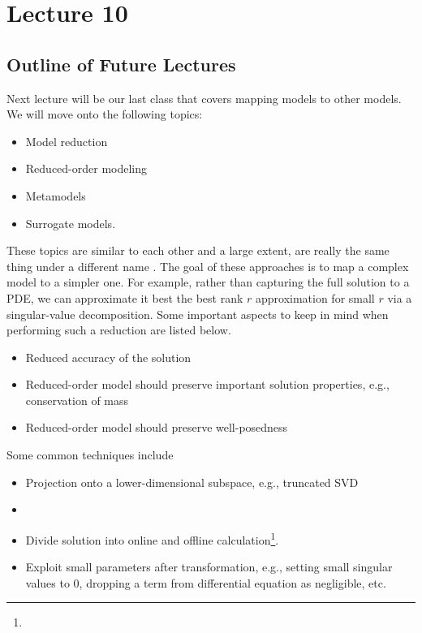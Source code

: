 \chapter{Lecture 10}
\section{}

\section{Outline of Future Lectures}
Next lecture will be our last class that covers mapping models to other models. We will move onto the following topics:
\begin{itemize}
    \item Model reduction
    \item Reduced-order modeling
    \item Metamodels
    \item Surrogate models.
\end{itemize}
These topics are similar to each other and a large extent, are really the same thing under a different name . The goal of these approaches is to map a complex model to a simpler one. For example, rather than capturing the full solution to a PDE, we can approximate it best the best rank $r$ approximation for small $r$ via a singular-value decomposition. Some important aspects to keep in mind when performing such a reduction are listed below.
\begin{itemize}
    \item Reduced accuracy of the solution
    \item Reduced-order model should preserve important solution properties, e.g., conservation of mass
    \item Reduced-order model should preserve well-posedness
\end{itemize}
Some common techniques include
\begin{itemize}
    \item Projection onto a lower-dimensional subspace, e.g., truncated SVD
    \item {}
    \item Divide solution into online and offline calculation\footnote{}.
    \item Exploit small parameters after transformation, e.g., setting small singular values to $0$, dropping a term from differential equation as negligible, etc.
\end{itemize}